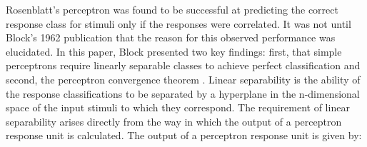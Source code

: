 \documentclass[11pt]{afthesis}
\begin{document}
	
	Rosenblatt's perceptron was found to be successful at predicting the correct response class for stimuli only if the responses were correlated. It was not until Block's 1962 publication that the reason for this observed performance was elucidated. In this paper, Block presented two key findings: first, that simple perceptrons require linearly separable classes to achieve perfect classification and second, the perceptron convergence theorem \cite{block1962perceptron}. Linear separability is the ability of the response classifications to be separated by a hyperplane in the n-dimensional space of the input stimuli to which they correspond. The requirement of linear separability arises directly from the way in which the output of a perceptron response unit is calculated. The output of a perceptron response unit is given by:
\end{document}
